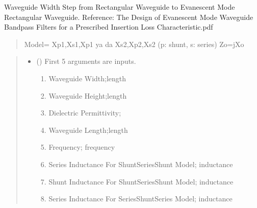 \documentclass[letterpaper,10pt,english]{sphinxmanual}
\begin{document}
\begin{fulllineitems}
\label{\detokenize{components:components.EvanescentWGEquivalent}}
\pysigstartsignatures
{}
\pysigstopsignatures
\sphinxAtStartPar
Waveguide Width Step from Rectangular Waveguide to Evanescent Mode Rectangular Waveguide.
Reference:  The Design of Evanescent Mode Waveguide Bandpass Filters for a Prescribed Insertion Loss Characteristic.pdf
\begin{quote}

\sphinxAtStartPar
Model= Xp1,Xs1,Xp1 ya da Xs2,Xp2,Xs2 (p: shunt, s: series)
Zo=jXo
\end{quote}
\begin{quote}\begin{description}
\begin{itemize}
\item {} 
\sphinxAtStartPar
{} () \textendash{} 
\sphinxAtStartPar
First 5 arguments are inputs.
\begin{enumerate}
%
\item {} 
\sphinxAtStartPar
Waveguide Width;length

\item {} 
\sphinxAtStartPar
Waveguide Height;length

\item {} 
\sphinxAtStartPar
Dielectric Permittivity;

\item {} 
\sphinxAtStartPar
Waveguide Length;length

\item {} 
\sphinxAtStartPar
Frequency; frequency

\item {} 
\sphinxAtStartPar
Series Inductance For Shunt\sphinxhyphen{}Series\sphinxhyphen{}Shunt Model; inductance

\item {} 
\sphinxAtStartPar
Shunt Inductance For Shunt\sphinxhyphen{}Series\sphinxhyphen{}Shunt Model; inductance

\item {} 
\sphinxAtStartPar
Series Inductance For Series\sphinxhyphen{}Shunt\sphinxhyphen{}Series Model; inductance


\end{enumerate}
\end{itemize}
\end{description}
\end{quote}
\end{fulllineitems}
\end{document}
